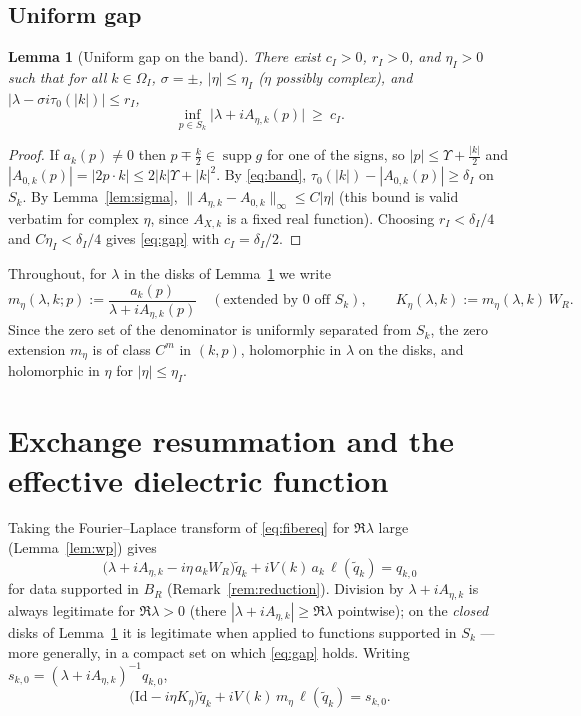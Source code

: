 \documentclass[11pt,a4paper]{amsart}
\newtheorem{lemma}[theorem]{Lemma}
\theoremstyle{definition}
\theoremstyle{remark}
\newcommand{\Id}{\mathrm{Id}}
\newcommand{\supp}{\operatorname{supp}}
\newcommand{\ellf}{\ell}
\begin{document}
\subsection{Uniform gap}
\begin{lemma}[Uniform gap on the band]\label{lem:gap}
There exist $c_I>0$, $r_I>0$, and $\eta_I>0$ such that for all $k\in\Omega_I$, $\sigma=\pm$, $|\eta|\le\eta_I$ \textup{(}$\eta$ possibly complex\textup{)}, and $|\lambda-\sigma i\tau_0(|k|)|\le r_I$,
\begin{equation}\label{eq:gap}
\inf_{p\in S_k}\bigl|\lambda+iA_{\eta,k}(p)\bigr|\ \ge\ c_I .
\end{equation}
\end{lemma}

\begin{proof}
If $a_k(p)\ne0$ then $p\mp\frac k2\in\supp g$ for one of the signs, so $|p|\le\Upsilon+\frac{|k|}2$ and $|A_{0,k}(p)|=|2p\cdot k|\le2|k|\Upsilon+|k|^2$. By \eqref{eq:band}, $\tau_0(|k|)-|A_{0,k}(p)|\ge\delta_I$ on $S_k$. By Lemma~\ref{lem:sigma}, $\|A_{\eta,k}-A_{0,k}\|_\infty\le C|\eta|$ (this bound is valid verbatim for complex $\eta$, since $A_{X,k}$ is a fixed real function). Choosing $r_I<\delta_I/4$ and $C\eta_I<\delta_I/4$ gives \eqref{eq:gap} with $c_I=\delta_I/2$.
\end{proof}

Throughout, for $\lambda$ in the disks of Lemma~\ref{lem:gap} we write
\begin{equation}\label{eq:mK}
m_\eta(\lambda,k;p):=\frac{a_k(p)}{\lambda+iA_{\eta,k}(p)}\quad(\text{extended by }0\text{ off }S_k),
\qquad
K_\eta(\lambda,k):=m_\eta(\lambda,k)\,W_R .
\end{equation}
Since the zero set of the denominator is uniformly separated from $S_k$, the zero extension $m_\eta$ is of class $C^{m}$ in $(k,p)$, holomorphic in $\lambda$ on the disks, and holomorphic in $\eta$ for $|\eta|\le\eta_I$.

\section{Exchange resummation and the effective dielectric function}\label{sec:schur}

Taking the Fourier--Laplace transform of \eqref{eq:fibereq} for $\Re\lambda$ large (Lemma~\ref{lem:wp}) gives
\begin{equation}\label{eq:laplace}
\bigl(\lambda+iA_{\eta,k}-i\eta\,a_kW_R\bigr)\widetilde q_k+iV(k)\,a_k\,\ellf(\widetilde q_k)=q_{k,0}
\end{equation}
for data supported in $B_R$ (Remark~\ref{rem:reduction}). Division by $\lambda+iA_{\eta,k}$ is always legitimate for $\Re\lambda>0$ (there $|\lambda+iA_{\eta,k}|\ge\Re\lambda$ pointwise); on the \emph{closed} disks of Lemma~\ref{lem:gap} it is legitimate when applied to functions supported in $S_k$ --- more generally, in a compact set on which \eqref{eq:gap} holds. Writing $s_{k,0}=(\lambda+iA_{\eta,k})^{-1}q_{k,0}$,
\begin{equation}\label{eq:reduced}
\bigl(\Id-i\eta K_\eta\bigr)\widetilde q_k+iV(k)\,m_\eta\,\ellf(\widetilde q_k)=s_{k,0}.
\end{equation}
\end{document}
